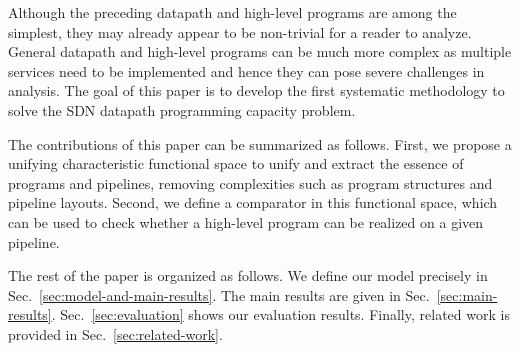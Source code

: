 Although the preceding datapath and high-level programs are among the simplest, they may already appear to be non-trivial for a reader to analyze. General datapath and high-level programs can be much more complex as multiple services need to be implemented and hence they can pose severe challenges in analysis. The goal of this paper is to develop the first systematic methodology to solve the SDN datapath programming capacity problem. 

The contributions of this paper can be summarized as follows. First, we  propose a unifying characteristic functional space to unify and extract the essence of programs and pipelines, removing complexities such as program structures and pipeline layouts. Second, we define a comparator in this functional space, which can be used to check whether a high-level program can be realized on a given pipeline.

The rest of the paper is organized as follows. We define our model precisely in Sec.~\ref{sec:model-and-main-results}. The main results are given in Sec.~\ref{sec:main-results}. Sec.~\ref{sec:evaluation} shows our evaluation results. Finally, related work is provided in Sec.~\ref{sec:related-work}.
